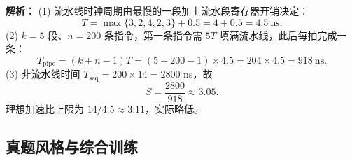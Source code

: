 \begin{enumerate}
\ifshowsolutions\par\noindent\textbf{解析：} (1) 流水线时钟周期由最慢的一段加上流水段寄存器开销决定：
\[
T=\max\{3,2,4,2,3\}+0.5=4+0.5=4.5\ \text{ns}.
\]
(2) $k=5$ 段、$n=200$ 条指令，第一条指令需 $5T$ 填满流水线，此后每拍完成一条：
\[
T_{\text{pipe}}=(k+n-1)T=(5+200-1)\times4.5=204\times4.5=918\ \text{ns}.
\]
(3) 非流水线时间 $T_{\text{seq}}=200\times14=2800$ ns，故
\[
S=\frac{2800}{918}\approx3.05 .
\]
理想加速比上限为 $14/4.5\approx3.11$，实际略低。\par\noindent
{}\else \answerarea \fi

\end{enumerate}

\subsection{真题风格与综合训练}


